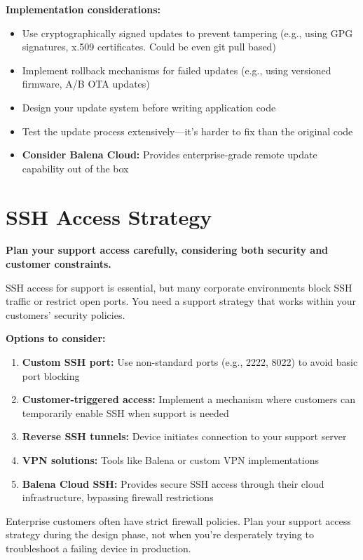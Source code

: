 \textbf{Implementation considerations:}
\begin{itemize}
\item Use cryptographically signed updates to prevent tampering (e.g., using GPG signatures, x.509 certificates. Could be even git pull based)
\item Implement rollback mechanisms for failed updates (e.g., using versioned firmware, A/B OTA updates)
\item Design your update system before writing application code
\item Test the update process extensively—it's harder to fix than the original code
\item \textbf{Consider Balena Cloud:} Provides enterprise-grade remote update capability out of the box
\end{itemize}

\section{SSH Access Strategy}

\textbf{Plan your support access carefully, considering both security and customer constraints.}

SSH access for support is essential, but many corporate environments block SSH traffic or restrict open ports. You need a support strategy that works within your customers' security policies.

\textbf{Options to consider:}
\begin{enumerate}
\item \textbf{Custom SSH port:} Use non-standard ports (e.g., 2222, 8022) to avoid basic port blocking
\item \textbf{Customer-triggered access:} Implement a mechanism where customers can temporarily enable SSH when support is needed
\item \textbf{Reverse SSH tunnels:} Device initiates connection to your support server
\item \textbf{VPN solutions:} Tools like Balena or custom VPN implementations
\item \textbf{Balena Cloud SSH:} Provides secure SSH access through their cloud infrastructure, bypassing firewall restrictions
\end{enumerate}

\begin{tcolorbox}[colback=yellow!10,colframe=orange!75!black,title=Real-World Constraint]
Enterprise customers often have strict firewall policies. Plan your support access strategy during the design phase, not when you're desperately trying to troubleshoot a failing device in production.
\end{tcolorbox}

